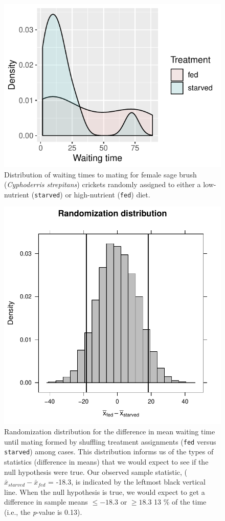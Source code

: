 \documentclass[fleqn,10pt]{wlpeerj} %
\begin{document}



\begin{figure}
\includegraphics[width=0.7\linewidth]{B4B_files/figure-latex/figure4-1} \caption{Distribution of waiting times to mating for female sage brush (\emph{Cyphoderris strepitans}) crickets randomly assigned to either a low-nutrient (\texttt{starved}) or high-nutrient (\texttt{fed}) diet.}\label{fig:figure4}
\end{figure}




\begin{figure}
\includegraphics[width=0.5\linewidth]{B4B_files/figure-latex/figure5-1} \caption{Randomization distribution for the difference in mean waiting time until mating formed by shuffling treatment assignments (\texttt{fed} versus \texttt{starved}) among cases. This distribution informs us of the types of statistics (difference in means) that we would expect to see if the null hypothesis were true. Our observed sample statistic, (\(\bar{x}_{starved}-\bar{x}_{fed}\) = -18.3, is indicated by the leftmost black vertical line. When the null hypothesis is true, we would expect to get a difference in sample means \(\le -18.3\) or \(\ge 18.3\) 13 \% of the time (i.e., the \emph{p}-value is 0.13).}\label{fig:figure5}
\end{figure}
\end{document}
